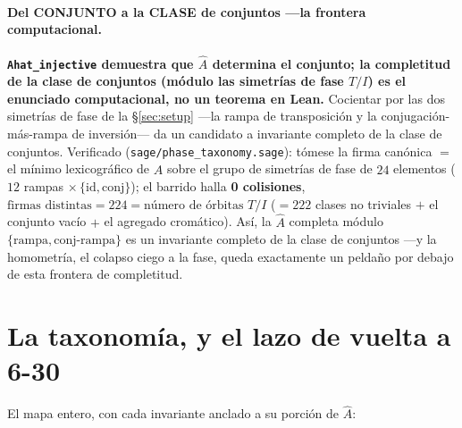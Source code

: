 \documentclass[11pt]{article}
\newcommand{\lean}[1]{\texttt{#1}}
\newcommand{\Ahat}{\hat{A}}
\begin{document}
\paragraph{Del CONJUNTO a la CLASE de conjuntos ---la frontera computacional.} \textbf{\lean{Ahat\_injective}
demuestra que $\Ahat$ determina el conjunto; la completitud de la clase de conjuntos (módulo las simetrías
de fase $T/I$) es el enunciado computacional, no un teorema en Lean.} Cocientar por las dos simetrías de
fase de la \S\ref{sec:setup} ---la rampa de transposición y la conjugación-más-rampa de inversión--- da un
candidato a invariante completo de la clase de conjuntos. Verificado (\lean{sage/phase\_taxonomy.sage}):
tómese la firma canónica $=$ el mínimo lexicográfico de $\Ahat$ sobre el grupo de simetrías de fase de
$24$ elementos ($12$ rampas $\times\,\{\mathrm{id},\mathrm{conj}\}$); el barrido halla \textbf{0
colisiones}, $\text{firmas distintas}=224=\text{número de órbitas }T/I$ ($=222$ clases no triviales $+$ el
conjunto vacío $+$ el agregado cromático). Así, la $\Ahat$ completa módulo
$\{\text{rampa},\text{conj-rampa}\}$ es un invariante completo de la clase de conjuntos ---y la homometría,
el colapso ciego a la fase, queda exactamente un peldaño por debajo de esta frontera de completitud.

\section{La taxonomía, y el lazo de vuelta a 6-30}\label{sec:taxonomy}

El mapa entero, con cada invariante anclado a su porción de $\Ahat$:
\end{document}
